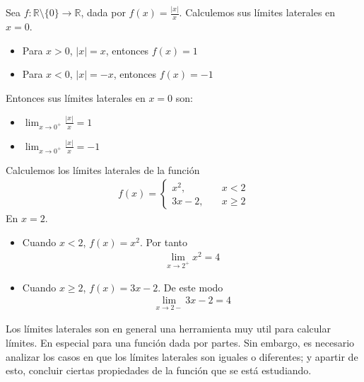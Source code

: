 \documentclass[12pt]{book}
\begin{document}
\begin{eje}{}{}
    Sea $f:\mathbb{R}\setminus\{0\}\to \mathbb{R}$, dada por $\displaystyle f(x)=\frac{|x|}{x}$. Calculemos sus límites laterales en $x=0$.

    \begin{itemize}
        \item Para $x>0$, $|x|=x$, entonces $f(x)=1$
        \item Para $x<0$, $|x|=-x$, entonces $f(x)=-1$
    \end{itemize}
    Entonces sus límites laterales en $x=0$ son:
    \begin{itemize}
        \item $\displaystyle \lim_{x \to 0^+}\frac{|x|}{x}=1$

        \item  $\displaystyle \lim_{x \to 0^+}\frac{|x|}{x}=-1$
    \end{itemize}
\end{eje}
\begin{eje}{}{}
    Calculemos los límites laterales de la función
    \begin{align*}
        f(x)=\begin{cases}
            x^2, \quad &x<2 \\
            3x-2, \quad &x\geq 2
        \end{cases}
    \end{align*}
    En $x=2$.
    \begin{itemize}
        \item Cuando $x<2$, $f(x)=x^2$. Por tanto
        \begin{align*}
            \lim_{x\to 2^+}x^2=4
        \end{align*}

        \item Cuando $x\geq 2$, $f(x)=3x-2$. De este modo
        \begin{align*}
            \lim_{x\to 2-}3x-2=4
        \end{align*}
    \end{itemize}
\end{eje}

Los límites laterales son en general una herramienta muy util para calcular límites. En especial para una función dada por partes. Sin embargo, es necesario analizar los casos en que los límites laterales son iguales o diferentes; y apartir de esto, concluir ciertas propiedades de la función que se está estudiando. \\
\end{document}
